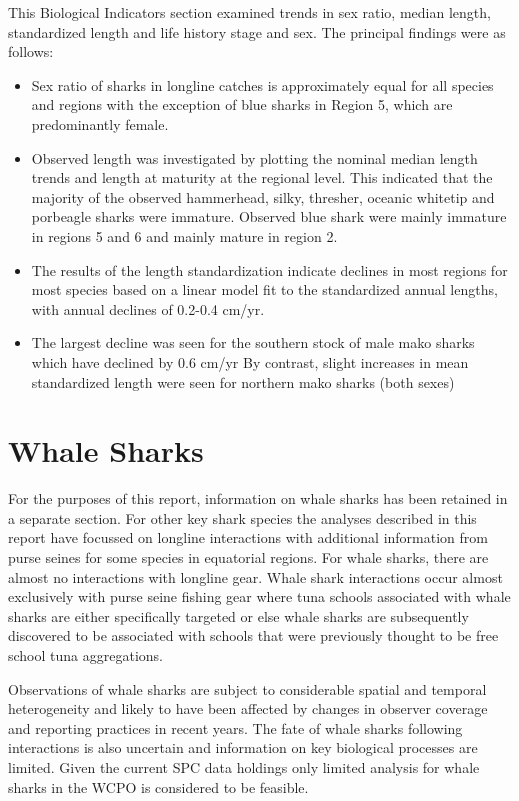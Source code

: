 \documentclass[12pt]{SCreport}
\begin{document}
This Biological Indicators section examined trends in sex ratio, median length, standardized length and life history stage and sex.  The principal findings were as follows:
\begin{itemize}
\item Sex ratio of sharks in longline catches is approximately equal for all species and regions with the exception of blue sharks in Region 5, which are predominantly female.
\item Observed length was investigated by plotting the nominal median length trends and length at
maturity at the regional level. This indicated that the majority of the observed hammerhead, silky,
thresher, oceanic whitetip and porbeagle sharks were immature. Observed blue shark were mainly
immature in regions 5 and 6 and mainly mature in region 2.
\item The results of the length standardization indicate declines in most regions for most species based
on a linear model fit to the standardized annual lengths, with annual declines of 0.2-0.4 cm/yr.
\item The largest decline was seen for the southern stock of male mako sharks which have declined by 0.6 cm/yr
By contrast, slight increases in mean standardized length were seen for northern mako sharks (both sexes)
\end{itemize}

      
 \clearpage     
  
\section{Whale Sharks}

For the purposes of this report, information on whale sharks has been retained in a separate section. For other key shark species the analyses described in this report have focussed on longline interactions with additional information from purse seines for some species in equatorial regions. For whale sharks, there are almost no interactions with longline gear. Whale shark interactions occur almost exclusively with purse seine fishing gear where tuna schools associated with whale sharks are either specifically targeted or else whale sharks are subsequently discovered to be associated with schools that were previously thought to be free school tuna aggregations.

Observations of whale sharks are subject to considerable spatial and temporal heterogeneity and likely to have been affected by changes in observer coverage and reporting practices in recent years. The fate of whale sharks following interactions is also uncertain and information on key biological processes are limited. Given the current SPC data holdings only limited analysis for whale sharks in the WCPO is considered to be feasible.
\end{document}
